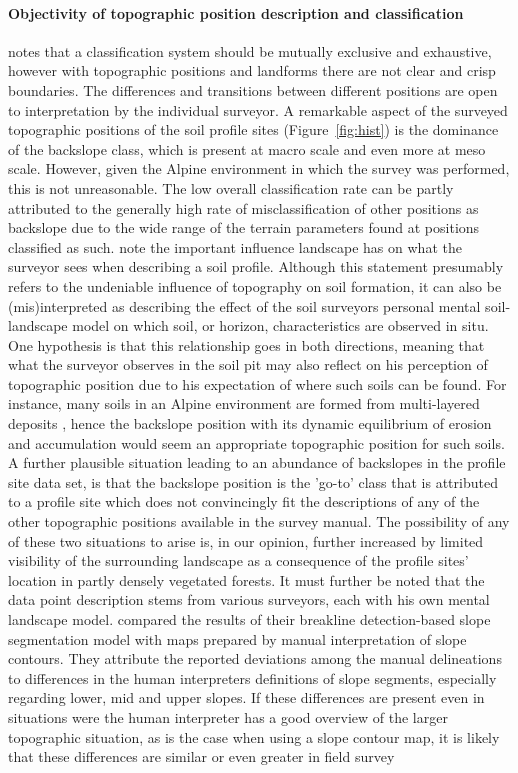\documentclass[preprint,12pt,authoryear]{elsarticle}
\begin{document}
\paragraph{Objectivity of topographic position description and classification}
\cite{Congalton1991} notes that a classification system should be mutually exclusive and exhaustive, however with topographic positions and landforms there are not clear and crisp boundaries. The differences and transitions between different positions are open to interpretation by the individual surveyor. A remarkable aspect of the surveyed topographic positions of the soil profile sites (Figure~\ref{fig:hist}) is the dominance of the backslope class, which is present at macro scale and even more at meso scale. However, given the Alpine environment in which the survey was performed, this is not unreasonable. The low overall classification rate can be partly attributed to the generally high rate of misclassification of other positions as backslope due to the wide range of the terrain parameters found at positions classified as such. \cite{Brevik2015} note the important influence landscape has on what the surveyor sees when describing a soil profile. Although this statement presumably refers to the undeniable influence of topography on soil formation, it can also be (mis)interpreted as describing the effect of the soil surveyors personal mental soil-landscape model on which soil, or horizon, characteristics are observed in situ. One hypothesis is that this relationship goes in both directions, meaning that what the surveyor observes in the soil pit may also reflect on his perception of topographic position due to his expectation of where such soils can be found. For instance, many soils in an Alpine environment are formed from multi-layered deposits \citep{Baruck2016,Geitner2011a}, hence the backslope position with its dynamic equilibrium of erosion and accumulation would seem an appropriate topographic position for such soils. A further plausible situation leading to an abundance of backslopes in the profile site data set, is that the backslope position is the 'go-to' class that is attributed to a profile site which does not convincingly fit the descriptions of any of the other topographic positions available in the survey manual. The possibility of any of these two situations to arise is, in our opinion, further increased by limited visibility of the surrounding landscape as a consequence of the profile sites' location in partly densely vegetated forests. It must further be noted that the data point description stems from various surveyors, each with his own mental landscape model. \cite{Matsuura2012} compared the results of their breakline detection-based slope segmentation model with maps prepared by manual interpretation of slope contours. They attribute the reported deviations among the manual delineations to differences in the human interpreters definitions of slope segments, especially regarding lower, mid and upper slopes. If these differences are present even in situations were the human interpreter has a good overview of the larger topographic situation, as is the case when using a slope contour map, it is likely that these differences are similar or even greater in field survey 
\end{document}

